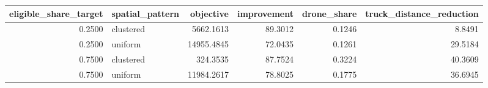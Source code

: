 \begin{tabular}{rlrrrr}
\toprule
eligible_share_target & spatial_pattern & objective & improvement & drone_share & truck_distance_reduction \\
\midrule
0.2500 & clustered & 5662.1613 & 89.3012 & 0.1246 & 8.8491 \\
0.2500 & uniform & 14955.4845 & 72.0435 & 0.1261 & 29.5184 \\
0.7500 & clustered & 324.3535 & 87.7524 & 0.3224 & 40.3609 \\
0.7500 & uniform & 11984.2617 & 78.8025 & 0.1775 & 36.6945 \\
\bottomrule
\end{tabular}
